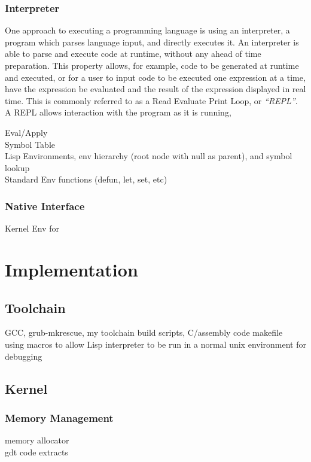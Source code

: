 \documentclass[11pt]{report}
\begin{document}
\subsection{Interpreter}
One approach to executing a programming language is using an interpreter, a program which parses language input, and directly executes it. An interpreter is able to parse and execute code at runtime, without any ahead of time preparation. This property allows, for example, code to be generated at runtime and executed, or for a user to input code to be executed one expression at a time, have the expression be evaluated and the result of the expression displayed in real time. This is commonly referred to as a Read Evaluate Print Loop, or \textit{``REPL''}. A REPL allows interaction with the program as it is running,  

Eval/Apply \\
Symbol Table \\
Lisp Environments, env hierarchy (root node with null as parent), and symbol lookup \\
Standard Env functions (defun, let, set, etc) \\

\subsection{Native Interface}
Kernel Env for \\

\chapter{Implementation}

\section{Toolchain}
GCC, grub-mkrescue, my toolchain build scripts, C/assembly code makefile \\
using macros to allow Lisp interpreter to be run in a normal unix environment for debugging \\

\section{Kernel}
\subsection{Memory Management}
memory allocator \\
gdt code extracts \\
\end{document}
